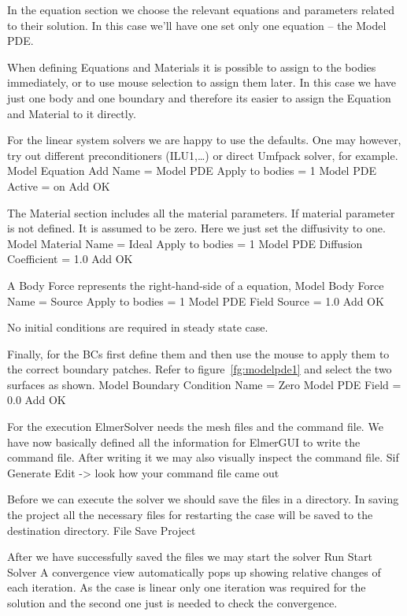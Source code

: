 In the equation section we choose the relevant equations and parameters related to their solution. 
In this case we'll have one set only one equation -- the Model PDE.


When defining Equations and Materials it is possible to assign to the bodies immediately, or to use mouse
selection to assign them later. In this case we have just one body and one boundary and therefore its easier to assign 
the Equation and Material to it directly.

For the linear system solvers we are happy to use the defaults. One may however, try out different
preconditioners (ILU1,\ldots) or direct Umfpack solver, for example.
\ttbegin
Model
  Equation
    Add 
      Name = Model PDE
      Apply to bodies = 1
      Model PDE
        Active = on
  Add   
  OK
\ttend        

The Material section includes all the material parameters.
If material parameter is not defined. It is assumed to be zero. 
Here we just set the diffusivity to one.
\ttbegin
Model
  Material
      Name = Ideal
      Apply to bodies = 1 
      Model PDE
        Diffusion Coefficient = 1.0
    Add
    OK
\ttend

A Body Force represents the right-hand-side of a equation,  
\ttbegin
Model
  Body Force
      Name = Source
      Apply to bodies = 1
      Model PDE
        Field Source = 1.0
    Add
    OK
\ttend    

No initial conditions are required in steady state case.

Finally, for the BCs first define them and then use the mouse to apply them to the correct
boundary patches.  Refer to figure~\ref{fg:modelpde1} and select the two surfaces as shown.
\ttbegin
Model
  Boundary Condition
      Name = Zero
      Model PDE
        Field = 0.0
    Add
    OK
\ttend   


For the execution ElmerSolver needs the mesh files and the command file. We have now basically defined
all the information for ElmerGUI to write the command file. After writing it we may also visually 
inspect the command file.
\ttbegin
Sif 
  Generate
  Edit -> look how your command file came out  
\ttend

Before we can execute the solver we should save the files in a directory. In saving the project all the
necessary files for restarting the case will be saved to the 
destination directory.
\ttbegin
File 
  Save Project
\ttend

After we have successfully saved the files we may start the solver
\ttbegin
Run
  Start Solver
\ttend
A convergence view automatically pops up showing relative changes of each iteration.
As the case is linear only one iteration was required for the solution and the second one
just is needed to check the convergence. 


